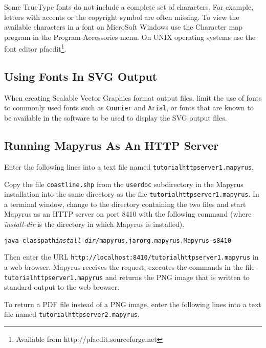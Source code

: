 Some TrueType fonts do not include a complete set of characters.
For example, letters with accents or the copyright symbol are often
missing.  To view the available characters in a font on MicroSoft Windows
use the Character map program in the Program-Accessories
menu.  On UNIX operating systems use the font editor
pfaedit\footnote{Available from http://pfaedit.sourceforge.net}.

\subsection{Using Fonts In SVG Output}
\label{svgfonts}

When creating Scalable Vector Graphics format output files,
limit the use of fonts to commonly used fonts such as \texttt{Courier}
and \texttt{Arial}, or fonts that are known to be available in the
software to be used to display the SVG output files.

\subsection{Running Mapyrus As An HTTP Server}
\label{tutorialhttpserver}

Enter the following lines into a text file named
\texttt{tutorialhttpserver1.mapyrus}.



Copy the file \texttt{coastline.shp} from the \texttt{userdoc}
subdirectory in the
Mapyrus installation into the same directory as the file
\texttt{tutorialhttpserver1.mapyrus}.  In a terminal window, change to the
directory containing the two files and start Mapyrus as an HTTP server on port
8410 with the following command
(where \textit{install-dir} is the directory in which Mapyrus is installed).

\begin{alltt}
java -classpath \textit{install-dir}/mapyrus.jar org.mapyrus.Mapyrus -s 8410
\end{alltt}

Then enter the URL \texttt{http://localhost:8410/tutorialhttpserver1.mapyrus} in a
web browser.  Mapyrus receives the request, executes the commands in the file
\texttt{tutorialhttpserver1.mapyrus} and returns the PNG image that is written to
standard output to the web browser.

To return a PDF file instead of a PNG image,
enter the following lines into a text file named
\texttt{tutorialhttpserver2.mapyrus}.

